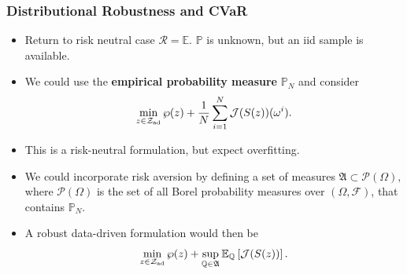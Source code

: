 \documentclass[aspectratio=169,xcolor=dvipsnames,10pt]{beamer}
\newcommand{\cJ}{\mathcal{J}}
\newcommand{\CVaR}{\textup{CVaR}}
\newcommand{\bbp}{\mathbb{P}}
\newcommand{\cF}{\mathcal{F}}
\newcommand{\Zad}{\mathcal{Z}_{\text{\textup{ad}}}}
\newcommand{\risk}{\mathcal{R}}
\begin{document}



\begin{frame}\frametitle{Distributional Robustness and CVaR}
\begin{exampleblock}{}
\begin{itemize}
\item Return to risk neutral case $\risk = \mathbb E$. \alert{$\bbp$ is unknown}, but an iid sample is available.
\item  We could use the \textbf{empirical probability measure} $\mathbb P_N$ and consider
\[
\min_{z \in \Zad} \wp(z) + \frac{1}{N} \sum_{i=1}^{N} \cJ(S(z))(\omega^i).
\]
\item This is a risk-neutral formulation, but expect \alert{overfitting}.
\item We could \alert{incorporate risk aversion} by defining a set of measures 
$
\mathfrak{A} \subset \mathcal{P}(\Omega),
$
where $\mathcal{P}(\Omega)$ is the set of all Borel probability measures over $(\Omega,\cF)$, that contains $\mathbb P_{N}$.
\item A robust data-driven formulation would then be
\[
\min_{z \in \Zad} \wp(z) + \sup_{\mathbb Q \in \mathfrak{A}}\mathbb E_{\mathbb Q}\left[ \cJ(S(z))\right].
\]
\end{itemize}
\end{exampleblock}
\end{frame}
\end{document}
